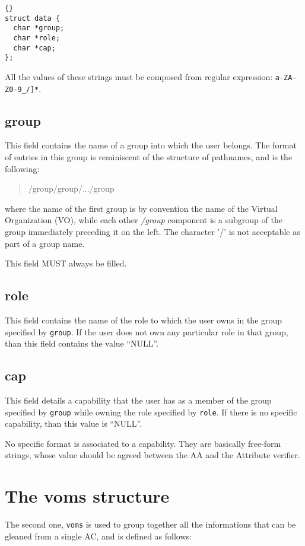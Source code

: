 \documentclass[a4paper]{book}
\begin{document}
{\begin{lstlisting}{}
struct data {
  char *group; 
  char *role;  
  char *cap;   
};
\end{lstlisting}}

All the values of these strings must be composed from regular
expression: \texttt{a-ZA-Z0-9\_/]*}.

\subsection{group}
This field contains the name of a group into which the user belongs.
The format of entries in this group is reminiscent of the structure of
pathnames, and is the following:
\begin{quote}
\begin{emph}
/group/group/.../group
\end{emph}
\end{quote}
where the name of the first group is by convention the name of the
Virtual Organization (VO), while each other \emph{/group} component is
a subgroup of the group immediately preceding it on the left. The
character '/' is not acceptable as part of a group name.

This field MUST always be filled.

\subsection{role}
This field contains the name of the role to which the user owns in the
group specified by \verb|group|.  If the user does not own any
particular role in that group, than this field contains the value
``NULL''.

\subsection{cap}
This field details a capability that the user has as a member of the
group specified by \verb|group| while owning the role specified by
\verb|role|.  If there is no specific capability, than this value is
``NULL''. 

No specific format is associated to a capability.  They are basically
free-form strings, whose value should be agreed between the AA and the
Attribute verifier.

\section{The voms structure}
The second one, \verb|voms| is used to group together all the
informations that can be gleaned from a single AC, and is defined as
follows:
\end{document}
